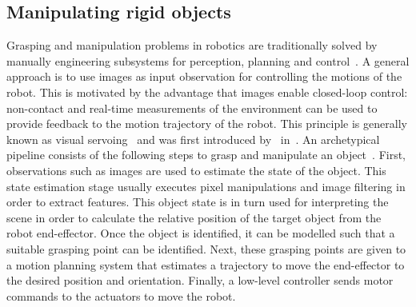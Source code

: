 \documentclass[\home/main.tex]{subfiles}
\begin{document}
\subsection{Manipulating rigid objects}
Grasping and manipulation problems in robotics are traditionally solved by manually engineering subsystems for perception, planning and control~\autocite{Siciliano2008}. A general approach is to use images as input observation for controlling the motions of the robot. This is motivated by the advantage that images enable closed-loop control: non-contact and real-time measurements of the environment can be used to provide feedback to the motion trajectory of the robot. This principle is generally known as visual servoing~\autocite{Hutchinson1996} and was first introduced by~\citeauthor{Hill1979} in~\citeyear{Hill1979}. An archetypical pipeline consists of the following steps to grasp and manipulate an object~\autocite{Corke1996}. First, observations such as images are used to estimate the state of the object. This state estimation stage usually executes pixel manipulations and image filtering in order to extract features. This object state is in turn used for interpreting the scene in order to calculate the relative position of the target object from the robot end-effector. Once the object is identified, it can be modelled such that a suitable grasping point can be identified. Next, these grasping points are given to a motion planning system that estimates a trajectory to move the end-effector to the desired position and orientation. Finally, a low-level controller sends motor commands to the actuators to move the robot.
\end{document}
